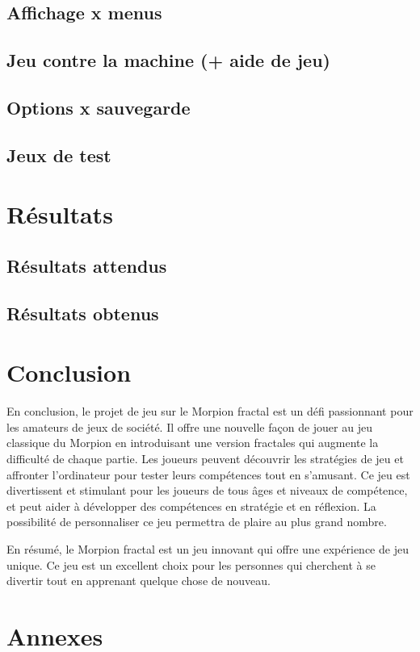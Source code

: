 \documentclass[12pt,a4paper]{article}
\begin{document}
    \subsection{Affichage x menus}
    \subsection{Jeu contre la machine (+ aide de jeu)}
    \subsection{Options x sauvegarde}
    \subsection{Jeux de test}



    \section{Résultats}
    \subsection{Résultats attendus}



     
    \subsection{Résultats obtenus}

    \section{Conclusion}



    En conclusion, le projet de jeu sur le Morpion fractal est un défi passionnant pour les amateurs de jeux de société. Il offre une nouvelle façon de jouer au jeu classique du Morpion en introduisant une version fractales qui augmente la difficulté de chaque partie. Les joueurs peuvent découvrir les stratégies de jeu et affronter l'ordinateur pour tester leurs compétences tout en s'amusant.
    Ce jeu est divertissent et stimulant pour les joueurs de tous âges et niveaux de compétence, et peut aider à développer des compétences en stratégie et en réflexion. La possibilité de personnaliser ce jeu permettra de plaire au plus grand nombre. 
    
    En résumé, le Morpion fractal est un jeu innovant  qui offre une expérience de jeu unique. Ce jeu est un excellent choix pour les personnes qui cherchent à se divertir tout en apprenant quelque chose de nouveau.

    \section{Annexes}
\end{document}
